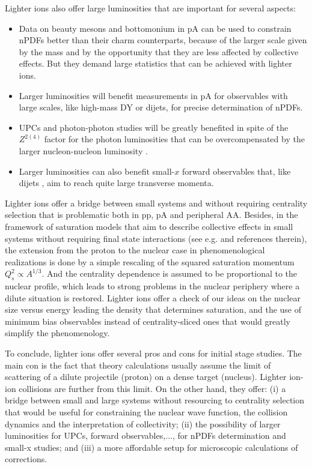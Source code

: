 \documentclass[../report.tex]{subfiles}
\begin{document}
Lighter ions also offer large luminosities that are important for several aspects:
\begin{itemize}
\item Data on beauty mesons and bottomonium in pA can be used to constrain nPDFs \cite{Kusina:2017gkz} better than their charm counterparts, because of the larger scale given by the mass and by the opportunity that they are less affected by collective effects. But they demand large statistics that can be achieved with lighter ions.
\item Larger luminosities will benefit measurements in pA for observables with large scales, like high-mass DY or dijets, for precise determination of nPDFs.
\item UPCs and photon-photon studies \cite{Baltz:2007kq} will be greatly benefited in spite of the $Z^{2(4)}$ factor for the photon luminosities that can be overcompensated by the larger nucleon-nucleon luminosity .
\item Larger luminosities can also benefit small-$x$ forward observables that, like dijets \cite{Dainese:2016gch}, aim to reach quite large transverse momenta.
\end{itemize}

Lighter ions offer a bridge between small systems and \PbPb without requiring centrality selection that is problematic both in pp, pA and peripheral AA. 
Besides, in the framework of saturation models \cite{Gelis:2010nm} that aim to describe collective effects in small systems without requiring final state interactions (see e.g. \cite{Kovner:2016wsq} and references therein), the extension from the proton to the nuclear case in phenomenological realizations  is done by a simple rescaling of the squared saturation momentum $Q_s^2\propto A^{1/3}$. And the centrality dependence is assumed to be proportional to the nuclear profile, which leads to strong problems in the nuclear periphery where a dilute situation is restored. Lighter ions offer a check of our ideas on the
nuclear size versus energy leading
the density that determines saturation, and the use of minimum bias observables
instead of centrality-sliced ones that
would greatly simplify the phenomenology.

To conclude, lighter ions offer several pros and cons for initial stage studies. The main con is the fact that theory calculations usually assume the limit of scattering of a dilute projectile (proton) on a dense target (nucleus). Lighter ion-ion collisions are further from this limit. On the other hand, they offer: (i) a bridge between small and large systems without resourcing to
centrality selection that would be useful for constraining the nuclear wave function, the
collision dynamics and the interpretation of collectivity;
(ii) the possibility of larger luminosities for UPCs, forward observables,$\dots$,
for nPDFs determination and small-x studies; and (iii)
a more affordable setup for microscopic calculations of corrections.
\end{document}
